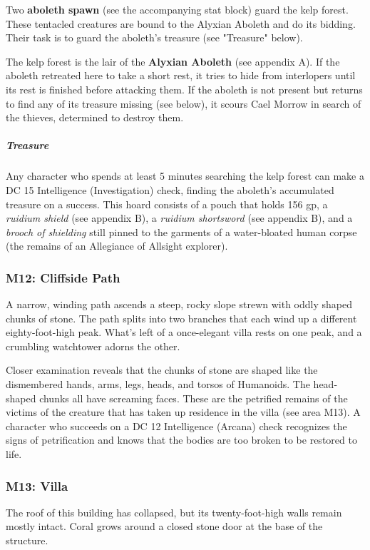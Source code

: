 \documentclass[10pt,a4paper,twoside,fancy,bg=print,twocolumn,openany,nodeprecatedcode]{dndbook}
\begin{document}
Two \textbf{aboleth spawn} (see the accompanying stat block) guard the kelp forest. These tentacled creatures are bound to the Alyxian Aboleth and do its bidding. Their task is to guard the aboleth's treasure (see "Treasure" below).

The kelp forest is the lair of the \textbf{Alyxian Aboleth} (see appendix A). If the aboleth retreated here to take a short rest, it tries to hide from interlopers until its rest is finished before attacking them. If the aboleth is not present but returns to find any of its treasure missing (see below), it scours Cael Morrow in search of the thieves, determined to destroy them.

\subparagraph{Treasure}
Any character who spends at least 5 minutes searching the kelp forest can make a DC 15 Intelligence (Investigation) check, finding the aboleth's accumulated treasure on a success. This hoard consists of a pouch that holds 156 gp, a \textit{ruidium shield} (see appendix B), a \textit{ruidium shortsword} (see appendix B), and a \textit{brooch of shielding} still pinned to the garments of a water-bloated human corpse (the remains of an Allegiance of Allsight explorer).

\subsubsection{M12: Cliffside Path}
\begin{DndReadAloud}{}
A narrow, winding path ascends a steep, rocky slope strewn with oddly shaped chunks of stone. The path splits into two branches that each wind up a different eighty-foot-high peak. What's left of a once-elegant villa rests on one peak, and a crumbling watchtower adorns the other.

\end{DndReadAloud}

Closer examination reveals that the chunks of stone are shaped like the dismembered hands, arms, legs, heads, and torsos of Humanoids. The head-shaped chunks all have screaming faces. These are the petrified remains of the victims of the creature that has taken up residence in the villa (see area M13). A character who succeeds on a DC 12 Intelligence (Arcana) check recognizes the signs of petrification and knows that the bodies are too broken to be restored to life.

\subsubsection{M13: Villa}
\begin{DndReadAloud}{}
The roof of this building has collapsed, but its twenty-foot-high walls remain mostly intact. Coral grows around a closed stone door at the base of the structure.

\end{DndReadAloud}
\end{document}

